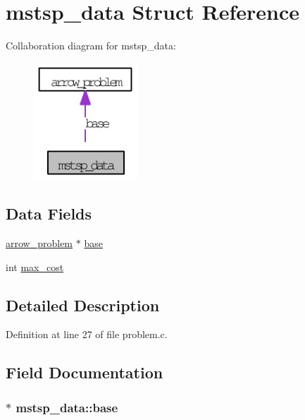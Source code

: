 \hypertarget{structmstsp__data}{
\section{mstsp\_\-data Struct Reference}
\label{structmstsp__data}
}
Collaboration diagram for mstsp\_\-data:\nopagebreak
\begin{figure}[H]
\begin{center}
\leavevmode
\includegraphics[width=110pt]{structmstsp__data__coll__graph}
\end{center}
\end{figure}
\subsection*{Data Fields}
\begin{CompactItemize}
\item 
\hyperlink{structarrow__problem}{arrow\_\-problem} $\ast$ \hyperlink{structmstsp__data_9b81f1294563a54268f8c19d1c8413e1}{base}
\item 
int \hyperlink{structmstsp__data_d67e756e8301f873f3b4d2f58b848380}{max\_\-cost}
\end{CompactItemize}


\subsection{Detailed Description}


Definition at line 27 of file problem.c.

\subsection{Field Documentation}
\hypertarget{structmstsp__data_9b81f1294563a54268f8c19d1c8413e1}{
\subsubsection[{base}]{$\ast$ {\bf mstsp\_\-data::base}}}
\label{structmstsp__data_9b81f1294563a54268f8c19d1c8413e1}


